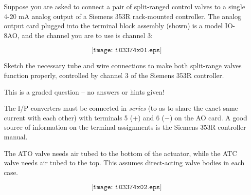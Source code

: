 

Suppose you are asked to connect a pair of split-ranged control valves to a single 4-20 mA analog output of a Siemens 353R rack-mounted controller.  The analog output card plugged into the terminal block assembly (shown) is a model IO-8AO, and the channel you are to use is channel 3:

$$\texttt{[image: i03374x01.eps]}$$

Sketch the necessary tube and wire connections to make both split-range valves function properly, controlled by channel 3 of the Siemens 353R controller.

\vfil 

\eject






This is a graded question -- no answers or hints given!
 






The I/P converters must be connected in {\it series} (to as to share the exact same current with each other) with terminals 5 (+) and 6 ($-$) on the AO card.  A good source of information on the terminal assignments is the Siemens 353R controller manual. 

The ATO valve needs air tubed to the bottom of the actuator, while the ATC valve needs air tubed to the top.   This assumes direct-acting valve bodies in each case.

$$\texttt{[image: i03374x02.eps]}$$




